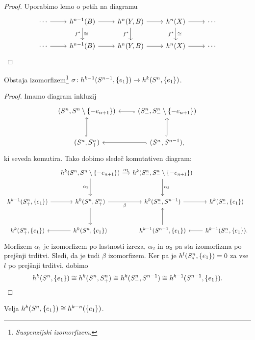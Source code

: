 \begin{proof}
Uporabimo lemo o petih na diagramu
\[
\begin{tikzcd}
\cdots \arrow[r] &
h^{n-1}(B) \arrow[r] \arrow[d, "f^*"', "\cong"] &
h^n(Y, B) \arrow[r] \arrow[d, "f^*"'] &
h^n(X) \arrow[r] \arrow[d, "f^*"', "\cong"] &
\cdots \\
\cdots \arrow[r] &
h^{n-1}(B) \arrow[r] &
h^n(Y, B) \arrow[r] &
h^n(X) \arrow[r] &
\cdots
\end{tikzcd}
\qedhere
\]
\end{proof}

\begin{trditev}
Obstaja izomorfizem\footnote{\emph{Suspenzijski izomorfizem}.}
$\sigma \colon
h^{k-1}(S^{n-1}, \left\{e_1\right\}) \to h^k(S^n, \left\{e_1\right\})$.
\end{trditev}

\begin{proof}
Imamo diagram inkluzij
\[
\begin{tikzcd}[row sep=large]
(S^n, S^n \setminus \set{-e_{n+1}}) &
(S_-^n, S_-^n \setminus \set{-e_{n+1}}) \arrow[l, hook] \\
(S^n, S_+^n) \arrow[u, hook] &
(S_-^n, S^{n-1}) \arrow[u, hook] \arrow[l, hook],
\end{tikzcd}
\]
ki seveda komutira. Tako dobimo sledeč komutativen diagram:
\[
\begin{tikzcd}[row sep=large, column sep=small]
&
h^k(S^n, S^n \setminus \set{-e_{n+1}})
\arrow[r, "\alpha_1"] \arrow[d, "\alpha_2"'] &
h^k(S_-^n, S_-^n \setminus \set{-e_{n+1}}) \arrow[d, "\alpha_3"] \\
h^{k-1}(S_+^n, \set{e_1}) \arrow[r] &
h^k(S^n, S_+^n) \arrow[r, "\beta"'] \arrow[d] &
h^k(S_-^n, S^{n-1}) \arrow[r] &
h^k(S_-^n, \set{e_1})
\\
h^k(S_+^n, \set{e_1}) &
h^k(S^n, \set{e_1}) \arrow[l] &
h^{k-1}(S^{n-1}, \set{e_1}) \arrow[u] &
h^{k-1}(S_-^n, \set{e_1}). \arrow[l]
\end{tikzcd}
\]
Morfizem $\alpha_1$ je izomorfizem po lastnosti izreza, $\alpha_2$
in $\alpha_3$ pa sta izomorfizma po prejšnji trditvi. Sledi, da je
tudi $\beta$ izomorfizem. Ker pa je $h^l(S_*^n, \left\{e_1\right\}) = 0$ za
vse $l$ po prejšnji trditvi, dobimo
\[
h^k(S^n, \left\{e_1\right\}) \cong
h^k(S^n, S_+^n) \cong
h^k(S_-^n, S^{n-1}) \cong
h^{k-1}(S^{n-1}, \left\{e_1\right\}). \qedhere
\]
\end{proof}

\begin{posledica}
Velja $h^k(S^n, \left\{e_1\right\}) \cong h^{k-n}(\left\{e_1\right\})$.
\end{posledica}


